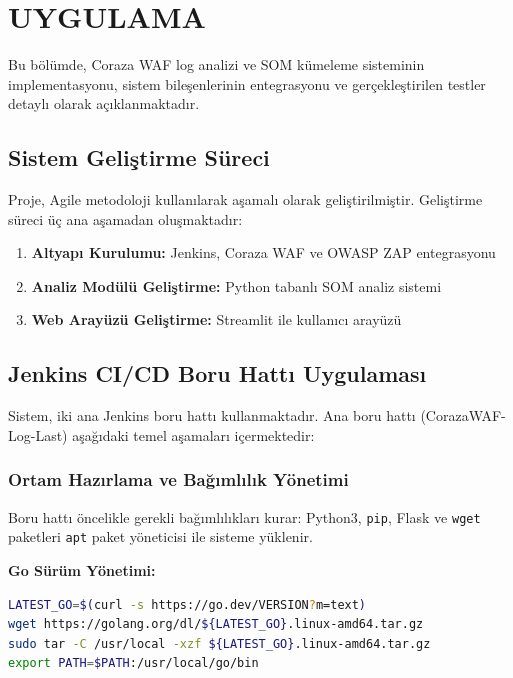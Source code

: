 \section{UYGULAMA}

Bu bölümde, Coraza WAF log analizi ve SOM kümeleme sisteminin implementasyonu, sistem bileşenlerinin entegrasyonu ve gerçekleştirilen testler detaylı olarak açıklanmaktadır.

\subsection{Sistem Geliştirme Süreci}

Proje, Agile metodoloji kullanılarak aşamalı olarak geliştirilmiştir. Geliştirme süreci üç ana aşamadan oluşmaktadır:

\begin{enumerate}
    \item \textbf{Altyapı Kurulumu:} Jenkins, Coraza WAF ve OWASP ZAP entegrasyonu
    \item \textbf{Analiz Modülü Geliştirme:} Python tabanlı SOM analiz sistemi
    \item \textbf{Web Arayüzü Geliştirme:} Streamlit ile kullanıcı arayüzü
\end{enumerate}

\subsection{Jenkins CI/CD Boru Hattı Uygulaması}

Sistem, iki ana Jenkins boru hattı kullanmaktadır. Ana boru hattı (CorazaWAF-Log-Last) aşağıdaki temel aşamaları içermektedir:

\subsubsection{Ortam Hazırlama ve Bağımlılık Yönetimi}

Boru hattı öncelikle gerekli bağımlılıkları kurar: Python3, \texttt{pip}, Flask ve \texttt{wget} paketleri \texttt{apt} paket yöneticisi ile sisteme yüklenir.

\textbf{Go Sürüm Yönetimi:}
\begin{lstlisting}[language=bash]
LATEST_GO=$(curl -s https://go.dev/VERSION?m=text)
wget https://golang.org/dl/${LATEST_GO}.linux-amd64.tar.gz
sudo tar -C /usr/local -xzf ${LATEST_GO}.linux-amd64.tar.gz
export PATH=$PATH:/usr/local/go/bin
\end{lstlisting}

